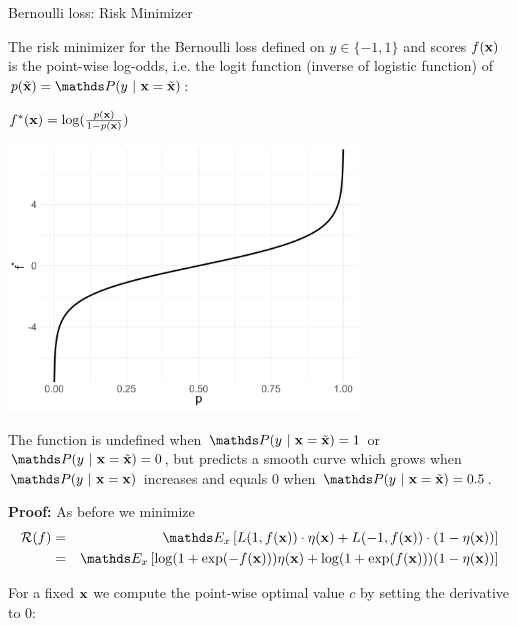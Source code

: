 \documentclass[11pt,compress,t,notes=noshow, xcolor=table]{beamer}
\begin{document}
\begin{vbframe}{Bernoulli loss: Risk Minimizer}
\begin{footnotesize}
\end{footnotesize}

\framebreak 

The risk minimizer for the Bernoulli loss defined on $y \in \{-1, 1\}$ and scores $f(\mathbf{x})$ is the point-wise log-odds, i.e. the logit function (inverse of logistic function) of $p(\xtil) = \P(y~|~\xv = \xtil)$:

\begin{minipage}{0.3\textwidth} 
	\centering
	{$f^{\ast}(\mathbf{x}) =  \log (\frac{p(\mathbf{x})}{1-p(\mathbf{x})})$}
\end{minipage}
\hspace{-.03\textwidth}
\begin{minipage}{0.7\textwidth}
	\centering	
	\includegraphics[width=0.7\textwidth]{figure/logistic_inverse.png}
\end{minipage}

The function is undefined when $\P(y~|~\xv = \xtil) = 1$ or $\P(y~|~\xv = \xtil) = 0$, but predicts a smooth curve which grows when $\P(y~|~\xv = \xv)$ increases and equals $0$ when $\P(y~|~\xv = \xtil) = 0.5$.

\framebreak 

\textbf{Proof: } As before we minimize 
\begin{eqnarray*}
  \riskf &=& \E_x \left[L(1, \fx) \cdot \eta(\xv) + L(-1, \fx) \cdot (1 - \eta(\xv)) \right] \\
  &=& \E_x \left[ \log(1 + \exp(- \fx)) \eta(\xv)+ \log(1 + \exp(\fx)) (1 - \eta(\xv)) \right] 
\end{eqnarray*}

For a fixed $\mathbf{x}$ we compute the point-wise optimal value $c$ by setting the derivative to $0$: 


\end{vbframe}
\end{document}
